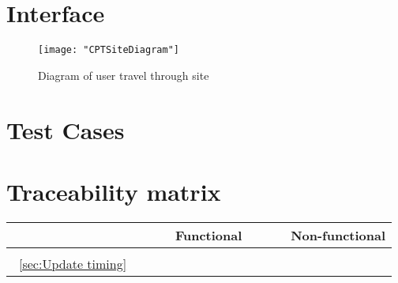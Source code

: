 \documentclass[12pt]{article}
\renewcommand{\c}{\checkmark}
\newcommand{\s}[1] {\begin{sideways}#1\end{sideways}}
\begin{document}
\section{Interface}
\begin{figure}[H]
\begin{center}
\texttt{[image: "CPTSiteDiagram"]}
\caption{Diagram of user  travel through site}
\label{fig:dia}
\end{center}
\end{figure}
\section{Test Cases}


\section{Traceability matrix}
\begin{center}
\begin{tabular}{|l||*{12}{c|}|*{4}{c|}}
\hline
\multicolumn{1}{|c||}{ }&
\multicolumn{12}{|c||}{Functional} &
\multicolumn{4}{|c|}{Non-functional}\\
\hline
	& \s{} & \\
\hline
\hline
~\ref{sec:Update timing}	&	\c \\
\hline
\end{tabular}
\end{center}
\end{document}
